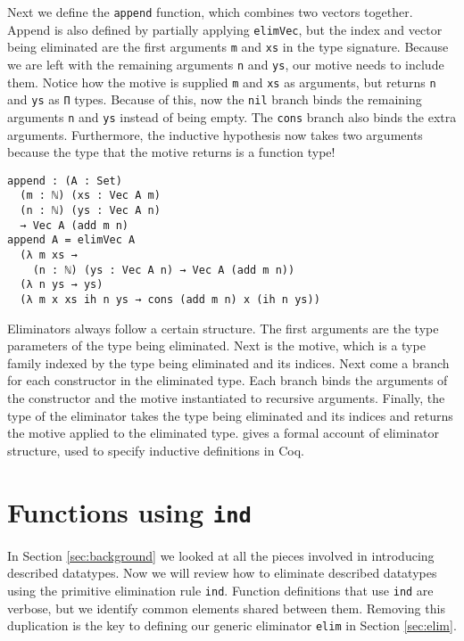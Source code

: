 \documentclass[preprint,nonatbib]{sigplanconf}
\begin{document}
Next we define the {\tt append} function, which combines two vectors
together. Append is also defined by partially applying
{\tt elimVec}, but the index and vector being eliminated are
the first arguments {\tt m} and {\tt xs} in the type signature.
Because we are left with the remaining arguments {\tt n} and 
{\tt ys}, our motive needs to include them. Notice how the motive is
supplied {\tt m} and {\tt xs} as arguments, but returns {\tt n} and
{\tt ys} as {\tt Π} types. Because of this, now the {\tt nil} branch
binds the remaining arguments {\tt n} and {\tt ys} instead of being
empty. The {\tt cons} branch also binds the extra arguments.
Furthermore, the inductive hypothesis now takes two arguments because
the type that the motive returns is a function type!

\begin{verbatim}
append : (A : Set)
  (m : ℕ) (xs : Vec A m)
  (n : ℕ) (ys : Vec A n)
  → Vec A (add m n)
append A = elimVec A
  (λ m xs →
    (n : ℕ) (ys : Vec A n) → Vec A (add m n))
  (λ n ys → ys)
  (λ m x xs ih n ys → cons (add m n) x (ih n ys))
\end{verbatim}

Eliminators always follow a certain structure. The first arguments are
the type parameters of the type being eliminated. Next is the motive,
which is a type family indexed by the type being eliminated and its
indices. Next come a branch for each constructor in the eliminated
type. Each branch binds the arguments of the constructor and the
motive instantiated to recursive arguments. Finally, the type of the
eliminator takes the type being eliminated and its indices and returns
the motive applied to the eliminated type. \citet{paulin1993inductive}
gives a formal account of eliminator structure, used to specify
inductive definitions in {\sc Coq}.

\section{Functions using {\tt ind}}
\label{sec:ind}

In Section \ref{sec:background} we looked at all the pieces involved
in introducing described datatypes. Now we will review how to
eliminate described datatypes using the primitive elimination
rule {\tt ind}. Function definitions that use {\tt ind} are verbose,
but we identify common elements shared between them. Removing
this duplication is the key to defining our generic eliminator
{\tt elim} in Section \ref{sec:elim}.
\end{document}

